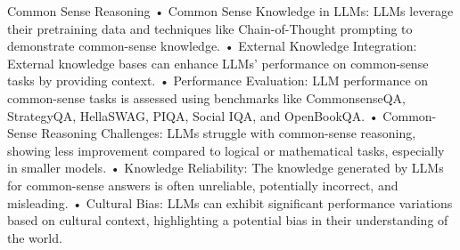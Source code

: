 \begin{frame}{Common Sense  Reasoning}
	•	Common Sense Knowledge in LLMs: LLMs leverage their pretraining data and techniques like Chain-of-Thought prompting to demonstrate common-sense knowledge.
	•	External Knowledge Integration: External knowledge bases can enhance LLMs’ performance on common-sense tasks by providing context.
	•	Performance Evaluation: LLM performance on common-sense tasks is assessed using benchmarks like CommonsenseQA, StrategyQA, HellaSWAG, PIQA, Social IQA, and OpenBookQA.
	•	Common-Sense Reasoning Challenges: LLMs struggle with common-sense reasoning, showing less improvement compared to logical or mathematical tasks, especially in smaller models.
	•	Knowledge Reliability: The knowledge generated by LLMs for common-sense answers is often unreliable, potentially incorrect, and misleading.
	•	Cultural Bias: LLMs can exhibit significant performance variations based on cultural context, highlighting a potential bias in their understanding of the world.

\end{frame}